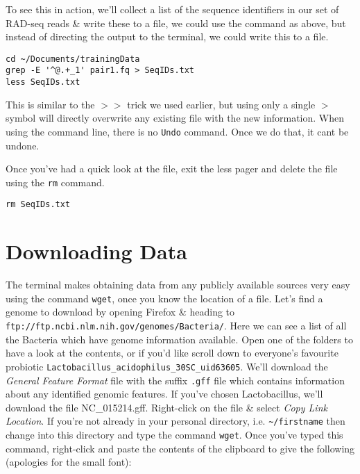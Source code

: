 \begin{steps}
To see this in action, we'll collect a list of the sequence identifiers in our set of RAD-seq reads \& write these to a file, we could use the command as above, but instead of directing the output to the terminal, we could write this to a file.
\end{steps}
\begin{lstlisting}
cd ~/Documents/trainingData
grep -E '^@.+_1' pair1.fq > SeqIDs.txt
less SeqIDs.txt
\end{lstlisting}

\begin{information}
This is similar to the $>>$ trick we used earlier, but using only a single $>$ symbol will directly overwrite any existing file with the new information.
When using the command line, there is no \texttt{Undo} command.
Once we do that, it cant be undone.
\end{information}

Once you've had a quick look at the file, exit the less pager and delete the file using the \texttt{rm} command.
\begin{lstlisting}
rm SeqIDs.txt
\end{lstlisting}

\section{Downloading Data}

\begin{steps}
The terminal makes obtaining data from any publicly available sources very easy using the command \texttt{wget}, once you know the location of a file.
Let's find a genome to download by opening Firefox \& heading to \texttt{ftp://ftp.ncbi.nlm.nih.gov/genomes/Bacteria/}.
Here we can see a list of all the Bacteria which have genome information available.
Open one of the folders to have a look at the contents, or if you'd like scroll down to everyone's favourite probiotic \texttt{Lactobacillus\_acidophilus\_30SC\_uid63605}.
We'll download the \textit{General Feature Format} file with the suffix \texttt{.gff} file which contains information about any identified genomic features.
If you've chosen Lactobacillus, we'll download the file NC\_015214.gff.
Right-click on the file \& select \textit{Copy Link Location}.
If you're not already in your personal directory, i.e. \texttt{\~{}/firstname} then change into this directory and type the command \texttt{wget}.
Once you've typed this command, right-click and paste the contents of the clipboard to give the following (apologies for the small font):
\end{steps}

